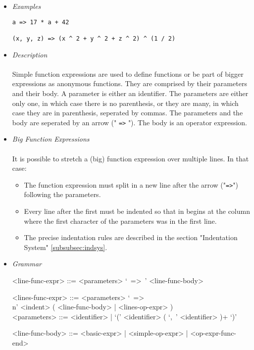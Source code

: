 \documentclass{article}
\begin{document}
\begin{itemize}
\item \textit{Examples}

\begin{verbatim}
a => 17 * a + 42

(x, y, z) => (x ^ 2 + y ^ 2 + z ^ 2) ^ (1 / 2)
\end{verbatim}

\item \textit{Description}\\\\
Simple function expressions are used to define functions or be part of bigger
expressions as anonymous functions. They are comprised by their parameters and
their body. A parameter is either an identifier. The parameters are either only one,
in which case there is no parenthesis, or they are many, in which case they are
in parenthesis, seperated by commas. The parameters and the body are seperated
by an arrow (" \texttt{=>} "). The body is an operator expression.

\item \textit{Big Function Expressions}\\\\
It is possible to stretch a (big) function expression over multiple lines.
In that case:
\begin{itemize}
\item
The function expression must split in a new line after the arrow
("\texttt{=>}") following the parameters.

\item
Every line after the first must be indented so that in begins at the column 
where the first character of the parameters was in the first line.

\item
The precise indentation rules are described in the section
"Indentation System" \ref{subsubsec:indsys}.
\end{itemize}

\item \textit{Grammar}
\begin{grammar}
<line-func-expr> ::=
<parameters> `\ =>\ ' <line-func-body>

<lines-func-expr> ::=
<parameters> `\ =>\\n' <indent> ( <line-func-body> | <lines-op-expr> )
\\

<parameters> ::= <identifier> | `(' <identifier> ( `,\ ' <identifier> )+ `)'

<line-func-body> ::= <basic-expr> | <simple-op-expr> | <op-expr-func-end>
\end{grammar}
\end{itemize}
\end{document}
